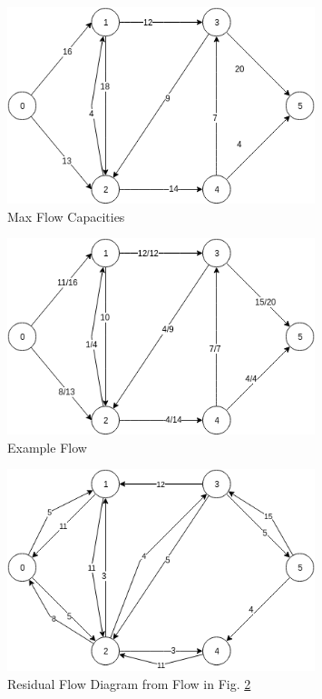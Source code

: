 \documentclass[12pt, letter]{article}
\begin{document}
\begin{figure}[h]
	\centering
	\includegraphics[width=0.8\textwidth]{flow}
	\caption{Max Flow Capacities}
	\label{fig:flow}
\end{figure}

\begin{figure}[h]
	\centering
	\includegraphics[width=0.8\textwidth]{ex-flow}
	\caption{Example Flow}
	\label{fig:ex-flow}
\end{figure}

\begin{figure}[h]
	\centering
	\includegraphics[width=0.8\textwidth]{res-flow}
	\caption{Residual Flow Diagram from Flow in Fig. \ref{fig:ex-flow}}
	\label{fig:res-flow}
\end{figure}
\end{document}
